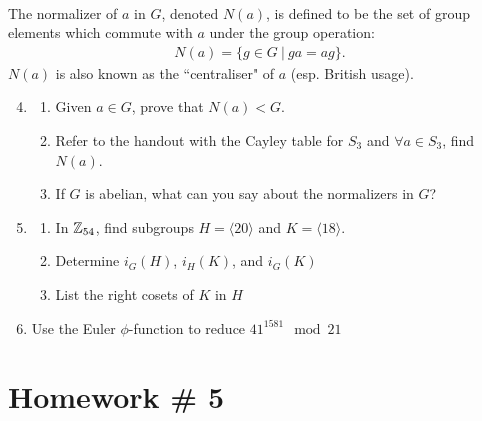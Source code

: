 \begin{definition}\hspace{0.1in} \\
The normalizer of $a$ in $G$, denoted $N(a)$, is defined to be the set of group elements which commute with $a$ under the group operation:
\begin{align}
    N(a)=\{g\in G \ | \ ga=ag\}. \nonumber
\end{align}
$N(a)$ is also known as the ``centraliser" of $a$ (esp. British usage).
\end{definition}
\vspace{0.1in}
\begin{enumerate}
\setcounter{enumi}{3}
    \item \begin{enumerate}[label=\alph*)]
        \item Given $a\in G$, prove that $N(a)<G$.
        \item Refer to the handout with the Cayley table for $S_3$ and $\forall a \in S_3$, find $N(a)$.
        \item If $G$ is abelian, what can you say about the normalizers in $G$? \\ \steezybreak
        
    \end{enumerate}
    \item \begin{enumerate}[label=\alph*)]
        \item In ${\mathbb{Z}}_{54}$, find subgroups $H=\langle 20 \rangle$ and $K= \langle 18 \rangle$.
        \item Determine $i_G(H)$, $i_H(K)$, and $i_G(K)$
        \item List the right cosets of $K$ in $H$ \\ \steezybreak
    \end{enumerate}
    \item Use the Euler $\phi$-function to reduce $41^{1581}\mod 21$
\end{enumerate}
\newpage
\section{Homework \# 5}
\label{sec:HW5}

